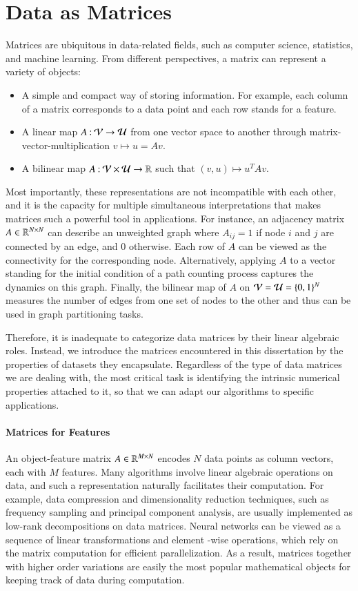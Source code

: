 \section{Data as Matrices}\label{pre:dam}

Matrices are ubiquitous in data\hyp{}related fields, such as computer science,
statistics, and machine learning. From different perspectives, a matrix can
represent a variety of objects:
\begin{itemize}
	\item A simple and compact way of storing information. For example, each
	column of a matrix corresponds to a data point and each row stands for a
	feature.
	\item A linear map $A\mathbin{:}\mathcal{V}\to\mathcal{U}$ from one vector space to another
	through matrix\hyp{}vector\hyp{}multiplication $v\mapsto u = Av$. 
	\item A bilinear map $A\mathbin{:}\mathcal{V}\times\mathcal{U}\to \mathbb{R}$ such that $(v,
	u)\mapsto u^TAv$.
\end{itemize}
Most importantly, these representations are not incompatible with each other,
and it is the capacity for multiple simultaneous interpretations that makes
matrices such a powerful tool in applications. For instance, an adjacency matrix
$A\in\mathbb{R}^{N\mathbin{\times} N}$ can describe an unweighted graph where $A_{ij} = 1$ if
node $i$ and $j$ are connected by an edge, and $0$ otherwise. Each row of $A$
can be viewed as the connectivity for the corresponding node. Alternatively,
applying $A$ to a vector standing for the initial condition of a path counting
process captures the dynamics on this graph. Finally, the bilinear map of $A$ on
$\mathcal{V} = \mathcal{U} = \{0, 1\}^N$ measures the number of edges from one set of nodes
to the other and thus can be used in graph partitioning tasks.

Therefore, it is inadequate to categorize data matrices by their linear
algebraic roles. Instead, we introduce the matrices encountered in this
dissertation by the properties of datasets they encapsulate. Regardless of the
type of data matrices we are dealing with, the most critical task is identifying
the intrinsic numerical properties attached to it, so that we can adapt our
algorithms to specific applications.

\paragraph{Matrices for Features}

An object\hyp{}feature matrix $A\in\mathbb{R}^{M\mathbin{\times} N}$ encodes $N$ data points as
column vectors, each with $M$ features. Many algorithms involve linear algebraic
operations on data, and such a representation naturally facilitates their
computation. For example, data compression and dimensionality reduction
techniques, such as frequency sampling and principal component analysis, are
usually implemented as low\hyp{}rank decompositions on data matrices. Neural
networks can be viewed as a sequence of linear transformations and element
\hyp{}wise operations, which rely on the matrix computation for efficient
parallelization. As a result, matrices together with higher order variations are
easily the most popular mathematical objects for keeping track of data during
computation.

